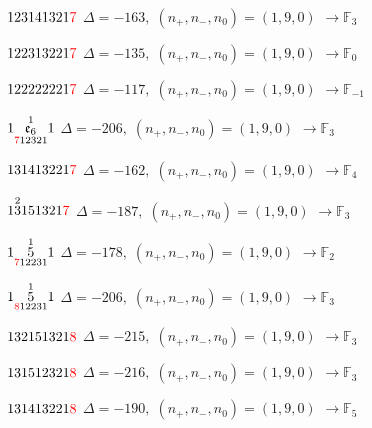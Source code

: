 \documentclass[10pt]{article}
\begin{document}
\smallskip

$123141321\textcolor{red}{7}$ \quad $\Delta=-163,\; (n_+,n_-,n_0)=(1,9,0)$ \quad $\to \mathbb{F}_{3}$

\smallskip

$122313221\textcolor{red}{7}$ \quad $\Delta=-135,\; (n_+,n_-,n_0)=(1,9,0)$ \quad $\to \mathbb{F}_{0}$

\smallskip

$122222221\textcolor{red}{7}$ \quad $\Delta=-117,\; (n_+,n_-,n_0)=(1,9,0)$ \quad $\to \mathbb{F}_{-1}$

\smallskip

$1\overset{1}{\underset{\textcolor{red}{7}12321}{\mathfrak{e}_6}}1$ \quad $\Delta=-206,\; (n_+,n_-,n_0)=(1,9,0)$ \quad $\to \mathbb{F}_{3}$

\smallskip

$131413221\textcolor{red}{7}$ \quad $\Delta=-162,\; (n_+,n_-,n_0)=(1,9,0)$ \quad $\to \mathbb{F}_{4}$

\smallskip

$1\overset{2}{3}151321\textcolor{red}{7}$ \quad $\Delta=-187,\; (n_+,n_-,n_0)=(1,9,0)$ \quad $\to \mathbb{F}_{3}$

\smallskip

$1\overset{1}{\underset{\textcolor{red}{7}12231}{5}}1$ \quad $\Delta=-178,\; (n_+,n_-,n_0)=(1,9,0)$ \quad $\to \mathbb{F}_{2}$

$1\overset{1}{\underset{\textcolor{red}{8}12231}{5}}1$ \quad $\Delta=-206,\; (n_+,n_-,n_0)=(1,9,0)$ \quad $\to \mathbb{F}_{3}$

\smallskip

$132151321\textcolor{red}{8}$ \quad $\Delta=-215,\; (n_+,n_-,n_0)=(1,9,0)$ \quad $\to \mathbb{F}_{3}$

\smallskip

$131512321\textcolor{red}{8}$ \quad $\Delta=-216,\; (n_+,n_-,n_0)=(1,9,0)$ \quad $\to \mathbb{F}_{3}$

\smallskip

$131413221\textcolor{red}{8}$ \quad $\Delta=-190,\; (n_+,n_-,n_0)=(1,9,0)$ \quad $\to \mathbb{F}_{5}$
\end{document}
